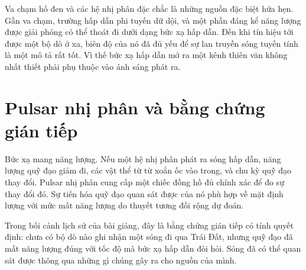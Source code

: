 \begin{classroomqa}
\end{classroomqa}

\begin{classroomqa}
\end{classroomqa}

Va chạm hố đen và các hệ nhị phân đặc chắc là những nguồn đặc biệt hứa hẹn. Gần va chạm, trường hấp dẫn phi tuyến dữ dội, và một phần đáng kể năng lượng được giải phóng có thể thoát đi dưới dạng bức xạ hấp dẫn. Đến khi tín hiệu tới được một bộ dò ở xa, biên độ của nó đã đủ yếu để sự lan truyền sóng tuyến tính là một mô tả rất tốt. Vì thế bức xạ hấp dẫn mở ra một kênh thiên văn không nhất thiết phải phụ thuộc vào ánh sáng phát ra.

\section{Pulsar nhị phân và bằng chứng gián tiếp}

Bức xạ mang năng lượng. Nếu một hệ nhị phân phát ra sóng hấp dẫn, năng lượng quỹ đạo giảm đi, các vật thể từ từ xoắn ốc vào trong, và chu kỳ quỹ đạo thay đổi. Pulsar nhị phân cung cấp một chiếc đồng hồ đủ chính xác để đo sự thay đổi đó. Sự tiến hóa quỹ đạo quan sát được của nó phù hợp về mặt định lượng với mức mất năng lượng do thuyết tương đối rộng dự đoán.

Trong bối cảnh lịch sử của bài giảng, đây là bằng chứng gián tiếp có tính quyết định: chưa có bộ dò nào ghi nhận một sóng đi qua Trái Đất, nhưng quỹ đạo đã mất năng lượng đúng với tốc độ mà bức xạ hấp dẫn đòi hỏi. Sóng đã có thể quan sát được thông qua những gì chúng gây ra cho nguồn của mình.

